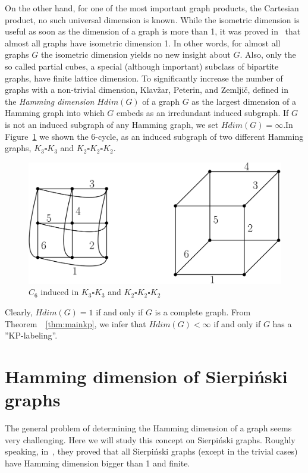 \documentclass[12pt,a4paper,titlepage,openany]{report}
\begin{document}
 On the other hand, for one of the most important graph products, the Cartesian product, no such universal dimension is known. While the isometric dimension is useful as soon as the dimension of a graph is more than 1, it was proved in~\cite{Poljak} that almost all graphs have isometric dimension 1. In other words, for almost all graphs $G$ the isometric dimension yields no new insight about $G$. Also, only the so called partial cubes, a special (although important) subclass of bipartite graphs, have finite lattice dimension.\newline
\newline
To significantly increase the number of graphs with a non-trivial dimension, Klav\v zar, Peterin, and Zemlji\v c, defined in~\cite{Sandi} the \textit{Hamming dimension} $Hdim(G )$ of a graph $G$ as the largest dimension of a Hamming graph into which $G$ embeds as an irredundant induced subgraph. If $G$ is not an induced subgraph of any Hamming graph, we set $Hdim ( G ) = \infty$.\newline In Figure~\ref{fig:c6hdim} we shown the 6-cycle, as an induced subgraph of two different Hamming graphs, $K_3\square K_3$ and $K_2\square K_2\square K_2$.
\begin{figure}[h]
\begin{center}
\includegraphics[width=1\linewidth]{figures/c_6hdim.png}
\end{center}
\caption{$C_6$ induced in $K_3\square K_3$ and $K_2\square K_2\square K_2$}\label{fig:c6hdim}
\end{figure}
Clearly, $Hdim ( G ) = 1$ if and only if $G$ is a complete graph. From Theorem~~\ref{thm:mainkp}, we infer that $Hdim ( G ) <\infty$ if and only if $G$ has a ''KP-labeling''.
\section{Hamming dimension of Sierpi\' nski graphs}
The general problem of determining the Hamming dimension of a graph seems very challenging. Here we will study this concept on Sierpi\' nski graphs. Roughly speaking, in~\cite{Sandi}, they proved that all Sierpi\'nski graphs (except in the trivial cases) have Hamming dimension bigger than 1 and finite. 
\end{document}
